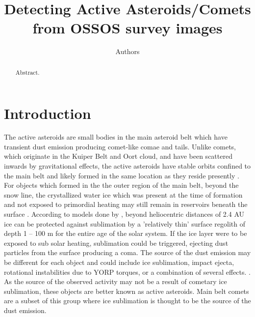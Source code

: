 \documentclass[iop,apj]{emulateapj}
\begin{document}
\title{Detecting Active Asteroids/Comets from OSSOS survey images}
\author{Authors}

\begin{abstract}
Abstract.
\end{abstract}

\maketitle

\section{Introduction}

The active asteroids are small bodies in the main asteroid belt which have transient dust emission producing comet-like comae and tails. Unlike comets, which originate in the Kuiper Belt and Oort cloud, and have been scattered inwards by gravitational effects, the active asteroids have stable orbits confined to the main belt and likely formed in the same location as they reside presently \citep{sheppard14} \citep{fernandez02}. 
For objects which formed in the the outer region of the main belt, beyond the snow line, the crystallized water ice which was present at the time of formation and not exposed to primordial heating may still remain in reservoirs beneath the surface \citep{sonnett11}.  According to models done by \citet*{fanale89},  beyond heliocentric distances of 2.4 AU ice can be protected against sublimation by a 'relatively thin' surface regolith  of depth 1 -- 100 m for the entire age of the solar system. If the ice layer were to be exposed to sub solar heating,  sublimation could be triggered,  ejecting dust particles from the surface producing a coma.  %
The source of the dust emission may be different for each object and could include ice sublimation, impact ejecta, rotational instabilities due to YORP torques, or a combination of several effects. \citep{hsieh15}. %
As the source of the observed activity may not be a result of cometary ice sublimation, these objects are better known as active asteroids. Main belt comets are a subset of this group where ice sublimation is thought to be the source of the dust emission. 
\end{document}
